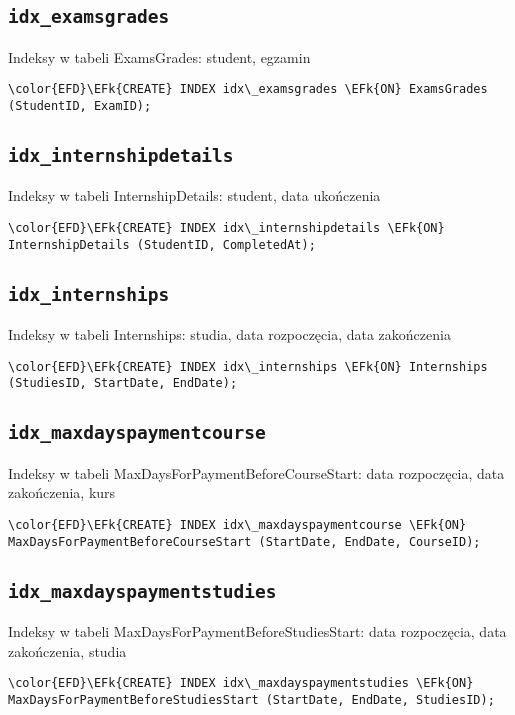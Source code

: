 \documentclass[11pt]{article}
\newcommand{\EFk}[1]{\textcolor{EFk}{\textbf{#1}}} %
\begin{document}
\subsection{\texttt{idx\_examsgrades}}
\label{sec:orga450c2a}
Indeksy w tabeli ExamsGrades: student, egzamin
\begin{Code}
\begin{Verbatim}
\color{EFD}\EFk{CREATE} INDEX idx\_examsgrades \EFk{ON} ExamsGrades (StudentID, ExamID);
\end{Verbatim}
\end{Code}
\subsection{\texttt{idx\_internshipdetails}}
\label{sec:orge622f0b}
Indeksy w tabeli InternshipDetails: student, data ukończenia
\begin{Code}
\begin{Verbatim}
\color{EFD}\EFk{CREATE} INDEX idx\_internshipdetails \EFk{ON} InternshipDetails (StudentID, CompletedAt);
\end{Verbatim}
\end{Code}
\subsection{\texttt{idx\_internships}}
\label{sec:orga07d1f4}
Indeksy w tabeli Internships: studia, data rozpoczęcia, data zakończenia
\begin{Code}
\begin{Verbatim}
\color{EFD}\EFk{CREATE} INDEX idx\_internships \EFk{ON} Internships (StudiesID, StartDate, EndDate);
\end{Verbatim}
\end{Code}
\subsection{\texttt{idx\_maxdayspaymentcourse}}
\label{sec:org54ed822}
Indeksy w tabeli MaxDaysForPaymentBeforeCourseStart: data rozpoczęcia, data zakończenia, kurs
\begin{Code}
\begin{Verbatim}
\color{EFD}\EFk{CREATE} INDEX idx\_maxdayspaymentcourse \EFk{ON} MaxDaysForPaymentBeforeCourseStart (StartDate, EndDate, CourseID);
\end{Verbatim}
\end{Code}
\subsection{\texttt{idx\_maxdayspaymentstudies}}
\label{sec:org1ce1c9a}
Indeksy w tabeli MaxDaysForPaymentBeforeStudiesStart: data rozpoczęcia, data zakończenia, studia
\begin{Code}
\begin{Verbatim}
\color{EFD}\EFk{CREATE} INDEX idx\_maxdayspaymentstudies \EFk{ON} MaxDaysForPaymentBeforeStudiesStart (StartDate, EndDate, StudiesID);
\end{Verbatim}
\end{Code}
\end{document}
